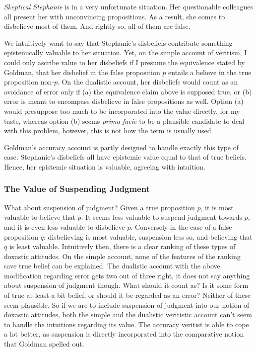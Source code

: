 \documentclass[12pt,numbers=noenddot]{scrartcl}
\begin{document}
\begin{description}
   \item \emph{Skeptical Stephanie} is in a very unfortunate situation. Her questionable colleagues all present her with unconvincing propositions. As a result, she comes to disbelieve most of them. And rightly so, all of them are false.
\end{description}

We intuitively want to say that Stephanie's disbeliefs contribute something epistemically valuable to her situation. Yet, on the simple account of veritism, I could only ascribe value to her disbeliefs if I presume the equivalence stated by Goldman, that her disbelief in the false proposition $p$ entails a believe in the true proposition non-$p$. On the dualistic account, her disbeliefs would count as an avoidance of error only if (a) the equivalence claim above is supposed true, or (b) error is meant to encompass disbelieve in false propositions as well. Option (a) would presuppose too much to be incorporated into the value directly, for my taste, whereas option (b) seems \emph{prima facie} to be a plausible candidate to deal with this problem, however, this is not how the term is usually used.

Goldman's accuracy account is partly designed to handle exactly this type of case. Stephanie's disbeliefs all have epistemic value equal to that of true beliefs. Hence, her epistemic situation is valuable, agreeing with intuition.

\subsubsection{The Value of Suspending Judgment}

What about suspension of judgment? Given a true proposition $p$, it is most valuable to believe that $p$. It seems less valuable to suspend judgment towards $p$, and it is even less valuable to disbelieve $p$. Conversely in the case of a false proposition $q$: disbelieving is most valuable, suspension less so, and believing that $q$ is least valuable. Intuitively then, there is a clear ranking of these types of doxastic attitudes. On the simple account, none of the features of the ranking save true belief can be explained. The dualistic account with the above modification regarding error gets two out of three right, it does not say anything about suspension of judgment though. What should it count as? Is it some form of true-at-least-a-bit belief, or should it be regarded as an error? Neither of these seem plausible. So if we are to include suspension of judgment into our notion of doxastic attitudes, both the simple and the dualistic veritistic account can't seem to handle the intuitions regarding its value. The accuracy veritist is able to cope a lot better, as suspension is directly incorporated into the comparative notion that Goldman spelled out.
\end{document}
